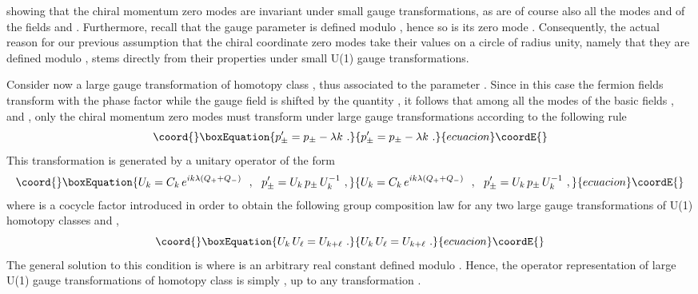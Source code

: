 \documentclass[a4paper,11pt]{article}
\begin{document}
showing that the chiral momentum zero modes \coordHE{} are invariant under 
small gauge transformations, as are of course also all the modes \coordHE{} and
\coordHE{} of the fields \coordHE{} and \coordHE{}. 
Furthermore, recall that the gauge parameter \coordHE{}
is defined modulo \coordHE{}, hence so is its zero mode \coordHE{}.
Consequently, the actual reason for our previous assumption that the
chiral coordinate zero modes \coordHE{} take their values on a circle
of radius unity, namely that they are defined modulo \myHighlight{$2\pi$}\coordHE{}, stems
directly from their properties under small U(1) gauge transformations.

Consider now a large gauge transformation of homotopy class \coordHE{}, thus
associated to the parameter \coordHE{}. Since in this case
the fermion fields \myHighlight{$\psi_\pm$}\coordHE{} transform with the phase factor
\coordHE{} while the gauge field \coordHE{} is shifted by the quantity
\coordHE{}, it follows that among all the modes
of the basic fields \coordHE{}, \coordHE{} and \coordHE{}, only the
chiral momentum zero modes \coordHE{} must transform under large gauge 
transformations according to the following rule
\begin{equation}\coord{}\boxEquation{
p'_\pm=p_\pm-\lambda k\ .
}{
p'_\pm=p_\pm-\lambda k\ .
}{ecuacion}\coordE{}\end{equation}
This transformation is generated by a unitary operator of the form
\begin{equation}\coord{}\boxEquation{
U_k=C_k\,e^{ik\lambda(Q_++Q_-)}\ \ ,\ \ 
p'_\pm=U_k\,p_\pm\,U^{-1}_k\ ,
}{
U_k=C_k\,e^{ik\lambda(Q_++Q_-)}\ \ ,\ \ 
p'_\pm=U_k\,p_\pm\,U^{-1}_k\ ,
}{ecuacion}\coordE{}\end{equation}
where \myHighlight{$C_k$}\coordHE{} is a cocycle factor introduced in order to obtain the following
group composition law for any two large gauge transformations
of U(1) homotopy classes \myHighlight{$k$}\coordHE{} and \myHighlight{$\ell$}\coordHE{},
\begin{equation}\coord{}\boxEquation{
U_k\,U_\ell=U_{k+\ell}\ .
}{
U_k\,U_\ell=U_{k+\ell}\ .
}{ecuacion}\coordE{}\end{equation}
The general solution to this condition is \coordHE{}
where \myHighlight{$\theta$}\coordHE{} is an arbitrary real constant defined modulo \myHighlight{$2\pi$}\coordHE{}.
Hence, the operator representation of large U(1) gauge transformations of 
homotopy class \myHighlight{$k$}\coordHE{} is simply \coordHE{},
up to any transformation \myHighlight{$U(\epsilon_0)$}\coordHE{}.
\end{document}
